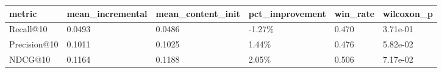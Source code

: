\begin{tabular}{llllll}
\toprule
metric & mean_incremental & mean_content_init & pct_improvement & win_rate & wilcoxon_p \\
\midrule
Recall@10 & 0.0493 & 0.0486 & -1.27\% & 0.470 & 3.71e-01 \\
Precision@10 & 0.1011 & 0.1025 & 1.44\% & 0.476 & 5.82e-02 \\
NDCG@10 & 0.1164 & 0.1188 & 2.05\% & 0.506 & 7.17e-02 \\
\bottomrule
\end{tabular}
